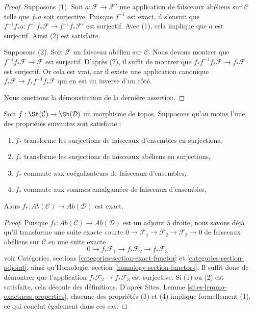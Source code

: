 \begin{proof}
Supposons (1). Soit $a : \mathcal{F} \to \mathcal{F}'$ une application de
faisceaux abéliens sur $\mathcal{C}$ telle que $f_*a$ soit surjective. Puisque
$f^{-1}$ est exact, il s'ensuit que
$f^{-1}f_*a : f^{-1}f_*\mathcal{F} \to f^{-1}f_*\mathcal{F}'$
est surjectif. Avec (1), cela implique que $a$ est surjectif. Ainsi (2) est
satisfaite.

\medskip\noindent
Supposons (2). Soit $\mathcal{F}$ un faisceau abélien sur $\mathcal{C}$. Nous
devons montrer que $f^{-1}f_*\mathcal{F} \to \mathcal{F}$ est surjectif.
D'après (2), il suffit de montrer que
$f_*f^{-1}f_*\mathcal{F} \to f_*\mathcal{F}$ est surjectif. Or cela est vrai,
car il existe une application canonique
$f_*\mathcal{F} \to f_*f^{-1}f_*\mathcal{F}$ qui en est un inverse d'un côté.

\medskip\noindent
Nous omettons la démonstration de la dernière assertion.
\end{proof}

\begin{lemma}
\label{lemma-exactness}
Soit $f : \Sh(\mathcal{C}) \to \Sh(\mathcal{D})$ un morphisme de topos.
Supposons qu'au moins l'une des propriétés suivantes soit satisfaite :
\begin{enumerate}
\item $f_*$ transforme les surjections de faisceaux d'ensembles en
surjections,
\item $f_*$ transforme les surjections de faisceaux abéliens en surjections,
\item $f_*$ commute aux coégalisateurs de faisceaux d'ensembles,
\item $f_*$ commute aux sommes amalgamées de faisceaux d'ensembles,
\end{enumerate}
Alors $f_* : \textit{Ab}(\mathcal{C}) \to \textit{Ab}(\mathcal{D})$ est
exact.
\end{lemma}

\begin{proof}
Puisque $f_* : \textit{Ab}(\mathcal{C}) \to \textit{Ab}(\mathcal{D})$ est un
adjoint à droite, nous savons déjà qu'il transforme une suite exacte courte
$0 \to \mathcal{F}_1 \to \mathcal{F}_2 \to \mathcal{F}_3 \to 0$
de faisceaux abéliens sur $\mathcal{C}$ en une suite exacte
$$
0 \to f_*\mathcal{F}_1 \to f_*\mathcal{F}_2 \to f_*\mathcal{F}_3
$$
voir Catégories, sections \ref{categories-section-exact-functor} et
\ref{categories-section-adjoint}, ainsi qu'Homologie, section
\ref{homology-section-functors}. Il suffit donc de démontrer que l'application
$f_*\mathcal{F}_2 \to f_*\mathcal{F}_3$ est surjective. Si (1) ou (2) est
satisfaite, cela découle des définitions. D'après Sites, Lemme
\ref{sites-lemma-exactness-properties}, chacune des propriétés (3) et (4)
implique formellement (1), ce qui conclut également dans ces cas.
\end{proof}

